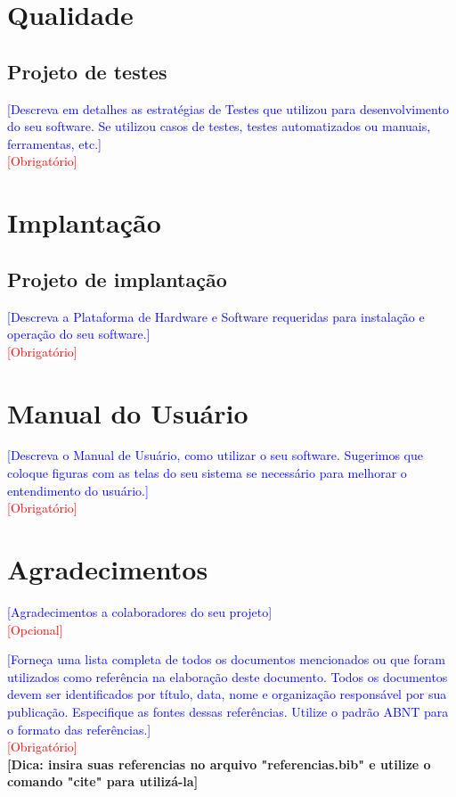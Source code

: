 \documentclass[10pt]{relatorio_tcc_ads_ifba}
\begin{document}
\section{Qualidade}

\subsection{Projeto de testes}
\textcolor{blue}{
    [Descreva em detalhes as estratégias de Testes que utilizou para desenvolvimento do seu software. Se utilizou casos de testes, testes automatizados ou manuais, ferramentas, etc.]
} \\
\textcolor{red}{[Obrigatório]}

\section{Implantação}
\subsection{Projeto de implantação}
\textcolor{blue}{
    [Descreva a Plataforma de Hardware e Software requeridas para instalação e operação do seu software.]
} \\
\textcolor{red}{[Obrigatório]}

\section{Manual do Usuário}{
\textcolor{blue}{
    [Descreva o Manual de Usuário, como utilizar o seu software. Sugerimos que coloque figuras com as telas do seu sistema se necessário para melhorar o entendimento do usuário.]
} \\
\textcolor{red}{[Obrigatório]}
}

\section*{Agradecimentos}
\textcolor{blue}{
    [Agradecimentos a colaboradores do seu projeto]
} \\
\textcolor{red}{[Opcional]}


\textcolor{blue}{
    [Forneça uma lista completa de todos os documentos mencionados ou que foram utilizados como referência na elaboração deste documento. Todos os documentos devem ser identificados por título, data, nome e organização responsável por sua publicação. Especifique as fontes dessas referências. Utilize o padrão ABNT para o formato das referências.]
} \\
\textcolor{red}{[Obrigatório]} \\
\textbf{[Dica: insira suas referencias no arquivo "referencias.bib" e utilize o comando "cite" para utilizá-la]}
\end{document}
